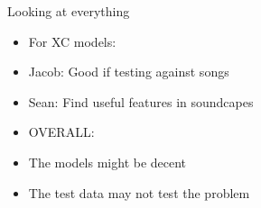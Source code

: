 \begin{frame}{Looking at everything}
    \begin{itemize}
        \item For XC models:
        \item Jacob: Good if testing against songs
        \item Sean: Find useful features in soundcapes
        \item OVERALL:
        \item The models might be decent
        \item The test data may not test the problem
    \end{itemize}
\end{frame}








